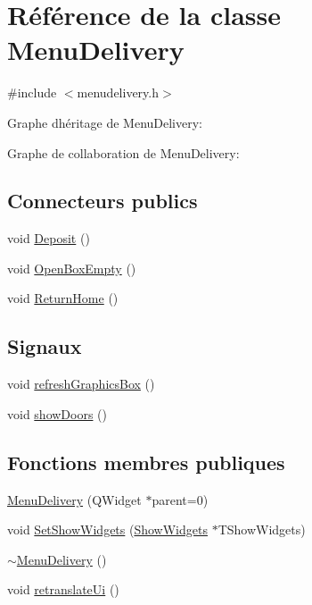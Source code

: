 \hypertarget{class_menu_delivery}{}\section{Référence de la classe Menu\+Delivery}
\label{class_menu_delivery}


{\ttfamily \#include $<$menudelivery.\+h$>$}



Graphe d\textquotesingle{}héritage de Menu\+Delivery\+:


Graphe de collaboration de Menu\+Delivery\+:
\subsection*{Connecteurs publics}
\begin{DoxyCompactItemize}
\item 
void \hyperlink{class_menu_delivery_a52fd4a7232869b37efa962d2f71d4fe0}{Deposit} ()
\item 
void \hyperlink{class_menu_delivery_a636b5dc403ed8c8dfd94b9de376d518b}{Open\+Box\+Empty} ()
\item 
void \hyperlink{class_menu_delivery_a9a7de928cfc99c01c8b00b91bb34cf9e}{Return\+Home} ()
\end{DoxyCompactItemize}
\subsection*{Signaux}
\begin{DoxyCompactItemize}
\item 
void \hyperlink{class_menu_delivery_abd3fdc900f7b7bdb147a6fa583c2db80}{refresh\+Graphics\+Box} ()
\item 
void \hyperlink{class_menu_delivery_a251ecdda65f9012db5fc374707833d85}{show\+Doors} ()
\end{DoxyCompactItemize}
\subsection*{Fonctions membres publiques}
\begin{DoxyCompactItemize}
\item 
\hyperlink{class_menu_delivery_acd2954af8174eb04a4d92dd734e5e2af}{Menu\+Delivery} (Q\+Widget $\ast$parent=0)
\item 
void \hyperlink{class_menu_delivery_a0690c41389fd1622cf25d8db93d3e6a1}{Set\+Show\+Widgets} (\hyperlink{class_show_widgets}{Show\+Widgets} $\ast$T\+Show\+Widgets)
\item 
\hyperlink{class_menu_delivery_ab938a57e58f417cea49092dacd240767}{$\sim$\+Menu\+Delivery} ()
\item 
void \hyperlink{class_menu_delivery_a07d62281ea306e42aed87bb03a959c99}{retranslate\+Ui} ()
\end{DoxyCompactItemize}


